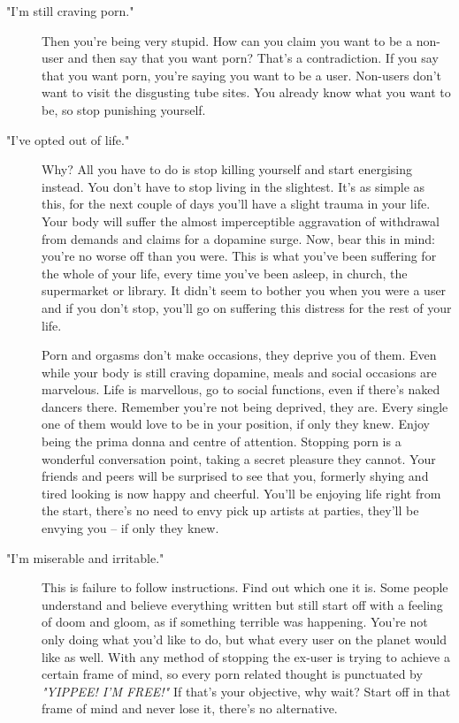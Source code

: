 \documentclass[easypeasy.tex]{subfiles}
\begin{document}
\begin{description}
\begin{description}
      \item ["I'm still craving porn."] Then you're being very stupid. How can you claim you want to be a non-user and then say that you want porn? That's a contradiction. If you say that you want porn, you're saying you want to be a user. Non-users don't want to visit the disgusting tube sites. You already know what you want to be, so stop punishing yourself.

      \item ["I've opted out of life."] Why? All you have to do is stop killing yourself and start energising instead. You don't have to stop living in the slightest. It's as simple as this, for the next couple of days you'll have a slight trauma in your life. Your body will suffer the almost imperceptible aggravation of withdrawal from demands and claims for a dopamine surge. Now, bear this in mind: you're no worse off than you were. This is what you've been suffering for the whole of your life, every time you've been asleep, in church, the supermarket or library. It didn't seem to bother you when you were a user and if you don't stop, you'll go on suffering this distress for the rest of your life.

      Porn and orgasms don't make occasions, they deprive you of them. Even while your body is still craving dopamine, meals and social occasions are marvelous. Life is marvellous, go to social functions, even if there's naked dancers there. Remember you're not being deprived, they are. Every single one of them would love to be in your position, if only they knew. Enjoy being the prima donna and centre of attention. Stopping porn is a wonderful conversation point, taking a secret pleasure they cannot. Your friends and peers will be surprised to see that you, formerly shying and tired looking is now happy and cheerful. You'll be enjoying life right from the start, there's no need to envy pick up artists at parties, they'll be envying you -- if only they knew.

    \item ["I'm miserable and irritable."] This is failure to follow instructions. Find out which one it is. Some people understand and believe everything written but still start off with a feeling of doom and gloom, as if something terrible was happening. You're not only doing what you'd like to do, but what every user on the planet would like as well. With any method of stopping the ex-user is trying to achieve a certain frame of mind, so every porn related thought is punctuated by \textit{"YIPPEE! I'M FREE!"} If that's your objective, why wait? Start off in that frame of mind and never lose it, there's no alternative.
    

\end{description}
\end{description}
\end{document}
